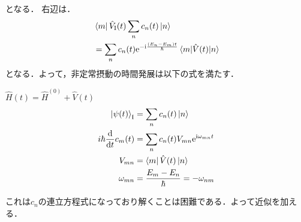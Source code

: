 \documentclass{report}
\begin{document}
  となる．
  右辺は．
  \begin{align}
    &\bra{m}\hat{V}_{\mathrm{I}}(t)\sum_{n}c_n(t)\ket{n}\\
    & = \sum_{n}c_n(t)\mathrm{e}^{-\mathrm{i}\frac{(E_n - E_m)t}{\hbar}}\mel{m}{\hat{V}(t)}{n}
  \end{align}
  となる．よって，非定常摂動の時間発展は以下の式を満たす．
  \begin{itembox}[l]{$\hat{H}(t) = \hat{H}^{(0)} + \hat{V}(t)$}
    \begin{align}
      \ket{\psi(t)}_{\mathrm{I}} &= \sum_{n}c_n(t)\ket{n}\\
      i\hbar\dv{t}c_m(t) &= \sum_{n}c_n(t)V_{mn}\mathrm{e}^{\mathrm{i}\omega_{mn}t}\\
      V_{mn} &= \bra{m}\hat{V}(t)\ket{n}\\
      \omega_{mn} &= \frac{E_m - E_n}{\hbar} = -\omega_{nm}
    \end{align}
  \end{itembox}
  これは$c_n$の連立方程式になっており解くことは困難である．よって近似を加える．
\end{document}

